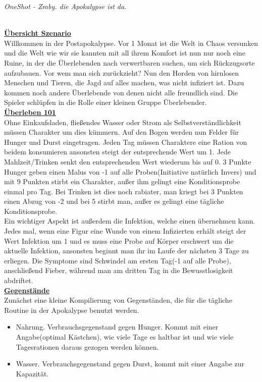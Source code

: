 \documentclass[twoside,a4paper]{minimal}
\begin{document}
\textit{OneShot - Zmby. die Apokalypse ist da.}
\setlength{\columnsep}{5pt}
\begin{multicols*}{3}
\textbf{\uline{\\Übersicht Szenario}}
\\Willkommen in der Postapokalypse. Vor 1 Monat ist die Welt in Chaos versunken und die Welt wie wir sie kannten mit all ihrem Komfort ist nun nur noch eine Ruine, in der die Überlebenden nach verwertbaren suchen, um sich Rückzugsorte aufzubauen. Vor wem man sich zurückzieht? Nun den Horden von hirnlosen Menschen und Tieren, die Jagd auf alles machen, was nicht infiziert ist. Dazu kommen noch andere Überlebende von denen nicht alle freundlich sind. Die Spieler schlüpfen in die Rolle einer kleinen Gruppe Überlebender.
\textbf{\uline{\\Überleben 101}}
\\Ohne Einkaufsladen, fließendes Wasser oder Strom als Selbstverständlichkeit müssen Charakter um dies kümmern. Auf den Bogen werden nun Felder für Hunger und Durst eingetragen. Jeden Tag müssen Charaktere eine Ration von beidem konsumieren ansonsten steigt der entsprechende Wert um 1. Jede Mahlzeit/Trinken senkt den entsprechenden Wert wiederum bis auf 0. 3 Punkte Hunger geben einen Malus von -1 auf alle Proben(Initiative natürlich Invers) und mit 9 Punkten stirbt ein Charakter, außer ihm gelingt eine Konditionsprobe einmal pro Tag. Bei Trinken ist dies noch rabiater, man kriegt bei 3 Punkten einen Abzug von -2 und bei 5 stirbt man, außer es gelingt eine tägliche Konditionsprobe.
\\Ein wichtiger Aspekt ist außerdem die Infektion, welche einen übernehmen kann. Jedes mal, wenn eine Figur eine Wunde von einem Infizierten erhält steigt der Wert Infektion um 1 und es muss eine Probe auf Körper erschwert um die aktuelle Infektion, ansonsten beginnt man ihr im Laufe der nächsten 3 Tage zu erliegen. Die Symptome sind Schwindel am ersten Tag(-1 auf alle Probe), anschließend Fieber, während man am dritten Tag in die Bewusstlosigkeit abdriftet.
\textbf{\uline{\\Gegenstände}}
\\Zunächst eine kleine Kompilierung von Gegenständen, die für die tägliche Routine in der Apokalypse benutzt werden.
\begin{itemize}
\item Nahrung. Verbrauchsgegenstand gegen Hunger. Kommt mit einer Angabe(optimal Kästchen), wie viele Tage es haltbar ist und wie viele Tagesrationen daraus gezogen werden können.
\item Wasser. Verbrauchsgegenstand gegen Durst, kommt mit einer Angabe zur Kapazität.

\end{itemize}
\end{multicols*}
\end{document}
